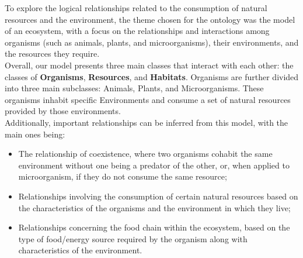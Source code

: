 




To explore the logical relationships related to the consumption of natural resources and the environment, the theme chosen for the ontology was the model of an ecosystem, with a focus on the relationships and interactions among organisms (such as animals, plants, and microorganisms), their environments, and the resources they require.
\\

Overall, our model presents three main classes that interact with each other: the classes of \textbf{Organisms}, \textbf{Resources}, and \textbf{Habitats}. Organisms are further divided into three main subclasses: Animals, Plants, and Microorganisms. These organisms inhabit specific Environments and consume a set of natural resources provided by those environments.
\\

Additionally, important relationships can be inferred from this model, with the main ones being:


\begin{itemize}
    \item The relationship of coexistence, where two organisms cohabit the same environment without one being a predator of the other, or, when applied to microorganism, if they do not consume the same resource;

    \item Relationships involving the consumption of certain natural resources based on the characteristics of the organisms and the environment in which they live;

    \item Relationships concerning the food chain within the ecosystem, based on the type of food/energy source required by the organism along with characteristics of the environment.
    \\
\end{itemize}


